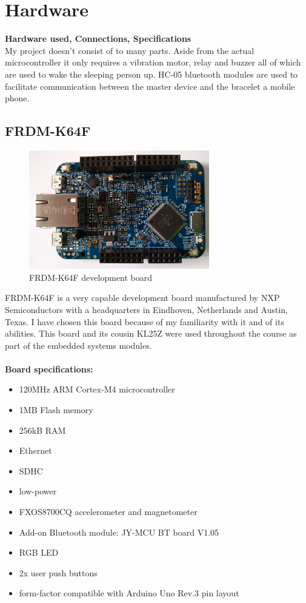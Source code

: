 \documentclass[12pt,a4paper]{article}
\begin{document}
	\section{Hardware}
	{\bfseries Hardware used, Connections, Specifications}\\
	
	My project doesn't consist of to many parts. Aside from the actual microcontroller it only 
	requires a vibration motor, relay and buzzer all of which are used to wake the sleeping person  
	up. HC-05 bluetooth modules are used to facilitate communication between the master device and  
	the bracelet a mobile phone.
		\subsection{FRDM-K64F}
		\begin{figure}[h]
			\centering
			\includegraphics[width=0.7\textwidth]{k64f1.jpg}\par\vspace{0cm}
			\caption{FRDM-K64F development board}
		\end{figure}
		FRDM-K64F is a very capable development board manufactured by NXP Semiconductors with a 
		headquarters in Eindhoven, Netherlands and Austin, Texas. I have chosen this board because  
		of my familiarity with it and of its abilities. This board and its cousin KL25Z were used  
		throughout the course as part of the embedded systems modules.\\  	
		\\
		{\bfseries Board specifications:}  	
		\begin{itemize}
			\item 120MHz ARM Cortex-M4 microcontroller
			\item 1MB Flash memory
			\item 256kB RAM
			\item Ethernet
			\item SDHC
			\item low-power
			\item FXOS8700CQ accelerometer and magnetometer 
			\item Add-on Bluetooth module: JY-MCU BT board V1.05
			\item RGB LED
			\item 2x user push buttons
			\item form-factor compatible with Arduino Uno Rev.3 pin layout
		\end{itemize}
		
\end{document}
